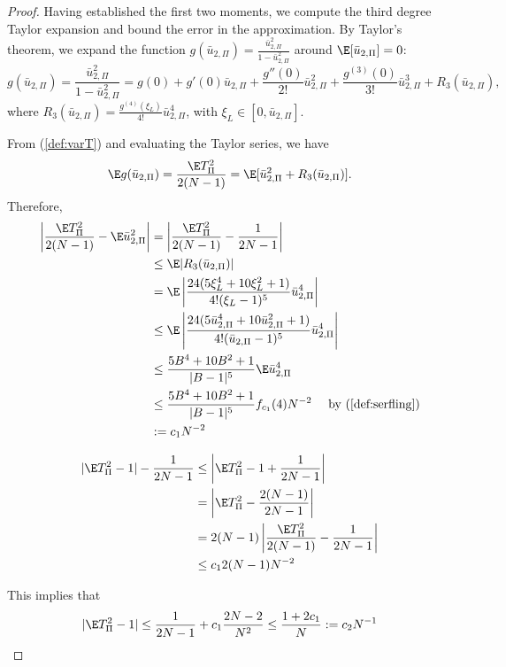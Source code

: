 \begin{proof}
  Having established the first two moments, we compute the third degree Taylor expansion and bound
  the error in the approximation. By Taylor's theorem, we expand the function $g(\bar{u}_{2,\Pi}) =
  \frac{\bar{u}_{2,\Pi}^2}{1-\bar{u}_{2,\Pi}^2}$ around $\E[\bar{u}_{2,\Pi}] = 0$:
  \begin{equation*}
    g(\bar{u}_{2,\Pi}) = \frac{\bar{u}_{2,\Pi}^2}{1-\bar{u}_{2,\Pi}^2} = g(0) + g'(0)
    \bar{u}_{2,\Pi} + \frac{g''(0)}{2!}\bar{u}_{2,\Pi}^2 +
    \frac{g^{(3)}(0)}{3!}\bar{u}_{2,\Pi}^3 + R_3(\bar{u}_{2,\Pi}),
  \end{equation*}
  where $R_3(\bar{u}_{2,\Pi}) = \frac{g^{(4)}(\xi_L)}{4!}\bar{u}_{2,\Pi}^4$, with
  $\xi_L \in [0, \bar{u}_{2,\Pi}]$.

  From (\ref{def:varT}) and evaluating the Taylor series, we have
  \begin{equation*}
    \E g(\bar{u}_{2,\Pi}) = \frac{\E T_{\Pi}^2}{2(N-1)} = \E[\bar{u}_{2,\Pi}^2 + R_3(\bar{u}_{2,\Pi})].
  \end{equation*}
  Therefore,
  \begin{align*}
    \left | \frac{\E T_{\Pi}^2}{2(N-1)} - \E \bar{u}_{2,\Pi}^2 \right |
    &= \left | \frac{\E T_{\Pi}^2}{2(N-1)} - \frac{1}{2N-1} \right | \\
    &\leq  \E |R_3(\bar{u}_{2,\Pi})| \\
    &= \E \left | \frac{24(5\xi_L^4 + 10 \xi_L^2 +
        1)}{4!(\xi_L-1)^5}\bar{u}_{2,\Pi}^4 \right | \\
    &\leq \E \left | \frac{24(5\bar{u}_{2,\Pi}^4 + 10 \bar{u}_{2,\Pi}^2 +
        1)}{4!(\bar{u}_{2,\Pi}-1)^5}\bar{u}_{2,\Pi}^4 \right | \\
    &\leq \frac{5B^4+10B^2+1}{|B-1|^5} \E \bar{u}_{2,\Pi}^4 \\
    &\leq \frac{5B^4+10B^2+1}{|B-1|^5} f_{c_1}(4) N^{-2} \quad \text{
      by } (\ref{def:serfling}) \\
    &:= c_1 N^{-2}
  \end{align*}

  \begin{align*}
    |\E T_{\Pi}^2 - 1| - \frac{1}{2N-1}
    &\leq \left | \E T_{\Pi}^2 - 1 + \frac{1}{2N-1} \right | \\
    &= \left | \E T_{\Pi}^2 - \frac{2(N-1)}{2N-1} \right | \\
    &= 2(N-1) \left | \frac{\E T_{\Pi}^2}{2(N-1)} - \frac{1}{2N-1} \right | \\
    &\leq c_1 2(N-1)N^{-2}
  \end{align*}

  This implies that
  \begin{equation*}
    |\E T_{\Pi}^2 - 1| \leq \frac{1}{2N-1} + c_1 \frac{2N-2}{N^2} \leq
    \frac{1 + 2c_1}{N} := c_2 N^{-1}
  \end{equation*}
\end{proof}

